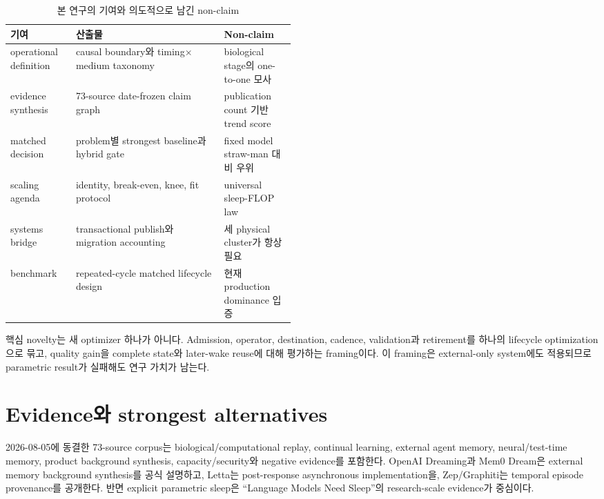 \begin{table}[htbp]
\centering
\caption{본 연구의 기여와 의도적으로 남긴 non-claim}
\label{tab:conf-contributions}
\begin{tabularx}{\linewidth}{L{0.23\linewidth} Y L{0.25\linewidth}}
\toprule
기여 & 산출물 & Non-claim \\
\midrule
operational definition & causal boundary와 timing$\times$medium taxonomy & biological stage의 one-to-one 모사 \\
evidence synthesis & 73-source date-frozen claim graph & publication count 기반 trend score \\
matched decision & problem별 strongest baseline과 hybrid gate & fixed model straw-man 대비 우위 \\
scaling agenda & identity, break-even, knee, fit protocol & universal sleep-FLOP law \\
systems bridge & transactional publish와 migration accounting & 세 physical cluster가 항상 필요 \\
benchmark & repeated-cycle matched lifecycle design & 현재 production dominance 입증 \\
\bottomrule
\end{tabularx}
\end{table}

핵심 novelty는 새 optimizer 하나가 아니다. Admission, operator, destination, cadence, validation과 retirement를
하나의 lifecycle optimization으로 묶고, quality gain을 complete state와 later-wake reuse에 대해 평가하는
framing이다. 이 framing은 external-only system에도 적용되므로 parametric result가 실패해도 연구 가치가
남는다.

\section{Evidence와 strongest alternatives}
\label{CONF-S02}

2026-08-05에 동결한 73-source corpus는 biological/computational replay, continual
learning, external agent memory, neural/test-time memory, product background
synthesis, capacity/security와 negative evidence를 포함한다. OpenAI Dreaming과 Mem0 Dream은 external
memory background synthesis를 공식 설명하고, Letta는 post-response asynchronous implementation을,
Zep/Graphiti는 temporal episode provenance를 공개한다.\autocite{srcstc0052,srcstc0059,srcstc0063,srcstc0065}
반면 explicit parametric sleep은 ``Language Models Need Sleep''의 research-scale evidence가 중심이다.
\autocite{srcstc0021}


